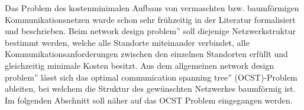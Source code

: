 Das Problem des kostenminimalen Aufbaus von vermaschten bzw. baumf{\"o}rmigen Kommunikationsnetzen wurde schon sehr fr{\"u}hzeitig in der Literatur formalisiert und beschrieben. Beim \glqq network design problem'' soll diejenige Netzwerkstruktur bestimmt werden, welche alle Standorte miteinander verbindet, alle Kommunikationsanforderungen zwischen den einzelnen Standorten erf{\"u}llt und gleichzeitig minimale Kosten besitzt. Aus dem allgemeinen \glqq network design problem'' l{\"a}sst sich das \glqq optimal communication spanning tree'' (OCST)-Problem ableiten, bei welchem die Struktur des gew{\"u}nschten Netzwerkes baumf{\"o}rmig ist. Im folgenden Abschnitt soll n{\"a}her auf das OCST Problem eingegangen werden.




